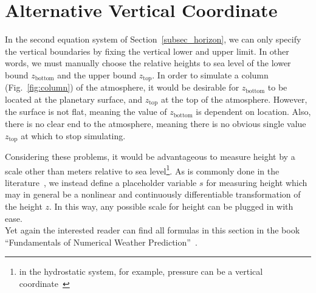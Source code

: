\section{Alternative Vertical Coordinate}\label{sec:alt_coor}
In the second equation system of Section~\ref{subsec_horizon}, we can only specify the vertical boundaries by fixing the vertical lower and upper limit.
In other words, we must manually choose the relative heights to sea level of the lower bound $z_{\text{bottom}}$ and the upper bound $z_{\text{top}}$.
In order to simulate a column (Fig.~\ref{fig:column}) of the atmosphere, it would be desirable for $z_{\text{bottom}}$ to be located at the planetary surface, and $z_{\text{top}}$ at the top of the atmosphere.
However, the surface is not flat, meaning the value of $z_{\text{bottom}}$ is dependent on location.
Also, there is no clear end to the atmosphere, meaning there is no obvious single value $z_{\text{top}}$ at which to stop simulating.

Considering these problems, it would be advantageous to measure height by a scale other than meters relative to sea level\footnote{in the hydrostatic system, for example, pressure can be a vertical coordinate~\cite{kasahara1974various}}.
As is commonly done in the literature~\cite{kasahara1974various}, we instead define a placeholder variable $s$ for measuring height which may in general be a nonlinear and continuously differentiable transformation of the height $z$.
In this way, any possible scale for height can be plugged in with ease.
\\

\noindent
Yet again the interested reader can find all formulas in this section in the book ``Fundamentals of Numerical Weather Prediction''~\cite{coiffier2011fundamentals}.


